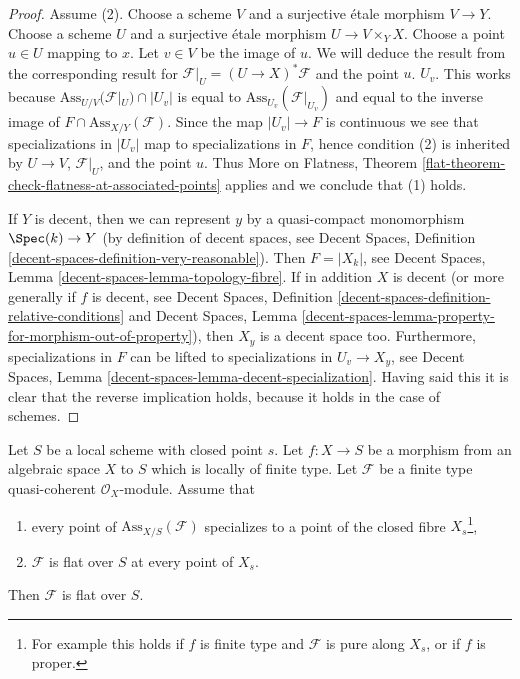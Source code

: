 \begin{proof}
Assume (2).
Choose a scheme $V$ and a surjective \'etale morphism $V \to Y$.
Choose a scheme $U$ and a surjective \'etale morphism $U \to V \times_Y X$.
Choose a point $u \in U$ mapping to $x$. Let $v \in V$ be the image of $u$.
We will deduce the result from the corresponding result for
$\mathcal{F}|_U = (U \to X)^*\mathcal{F}$ and the point $u$.
$U_v$. This works because $\text{Ass}_{U/V}(\mathcal{F}|_U) \cap |U_v|$
is equal to $\text{Ass}_{U_v}(\mathcal{F}|_{U_v})$ and equal to the inverse
image of $F \cap \text{Ass}_{X/Y}(\mathcal{F})$.
Since the map $|U_v| \to F$ is continuous we see that
specializations in $|U_v|$ map to specializations in $F$,
hence condition (2) is inherited by $U \to V$,
$\mathcal{F}|_U$, and the point $u$.
Thus More on Flatness, Theorem
\ref{flat-theorem-check-flatness-at-associated-points} applies
and we conclude that (1) holds.

\medskip\noindent
If $Y$ is decent, then we can represent
$y$ by a quasi-compact monomorphism $\Spec(k) \to Y$
(by definition of decent spaces, see
Decent Spaces, Definition \ref{decent-spaces-definition-very-reasonable}).
Then $F = |X_k|$, see
Decent Spaces, Lemma \ref{decent-spaces-lemma-topology-fibre}.
If in addition $X$ is decent (or more generally if $f$ is decent, see
Decent Spaces, Definition \ref{decent-spaces-definition-relative-conditions}
and Decent Spaces, Lemma
\ref{decent-spaces-lemma-property-for-morphism-out-of-property}),
then $X_y$ is a decent space too. Furthermore, specializations in
$F$ can be lifted to specializations
in $U_v \to X_y$, see
Decent Spaces, Lemma \ref{decent-spaces-lemma-decent-specialization}.
Having said this it is clear that the reverse implication
holds, because it holds in the case of schemes.
\end{proof}

\begin{lemma}
\label{lemma-check-along-closed-fibre}
Let $S$ be a local scheme with closed point $s$.
Let $f : X \to S$ be a morphism from an algebraic space $X$ to $S$
which is locally of finite type.
Let $\mathcal{F}$ be a finite type quasi-coherent $\mathcal{O}_X$-module.
Assume that
\begin{enumerate}
\item every point of $\text{Ass}_{X/S}(\mathcal{F})$ specializes
to a point of the closed fibre $X_s$\footnote{For example this holds if
$f$ is finite type and $\mathcal{F}$ is pure along $X_s$, or
if $f$ is proper.},
\item $\mathcal{F}$ is flat over $S$ at every point of $X_s$.
\end{enumerate}
Then $\mathcal{F}$ is flat over $S$.
\end{lemma}

